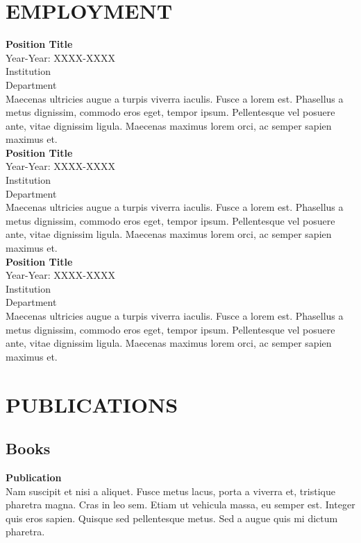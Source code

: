 \documentclass[a4paper,9pt]{extarticle}
\begin{document}
\section*{EMPLOYMENT}
\noindent
\newline
\textbf{Position Title} \\
Year-Year: XXXX-XXXX \\
Institution \\ 
Department \\
Maecenas ultricies augue a turpis viverra iaculis. Fusce a lorem est. Phasellus a metus dignissim, commodo eros eget, tempor ipsum. Pellentesque vel posuere ante, vitae dignissim ligula. Maecenas maximus lorem orci, ac semper sapien maximus et. \\ 

\noindent
\textbf{Position Title} \\
Year-Year: XXXX-XXXX \\
Institution \\ 
Department \\
Maecenas ultricies augue a turpis viverra iaculis. Fusce a lorem est. Phasellus a metus dignissim, commodo eros eget, tempor ipsum. Pellentesque vel posuere ante, vitae dignissim ligula. Maecenas maximus lorem orci, ac semper sapien maximus et. \\

\noindent
\textbf{Position Title} \\
Year-Year: XXXX-XXXX \\
Institution \\ 
Department \\
Maecenas ultricies augue a turpis viverra iaculis. Fusce a lorem est. Phasellus a metus dignissim, commodo eros eget, tempor ipsum. Pellentesque vel posuere ante, vitae dignissim ligula. Maecenas maximus lorem orci, ac semper sapien maximus et. 


\section*{PUBLICATIONS}
 
\subsection*{Books}
\textbf{Publication} \\ 
Nam suscipit et nisi a aliquet. Fusce metus lacus, porta a viverra et, tristique pharetra magna. Cras in leo sem. Etiam ut vehicula massa, eu semper est. Integer quis eros sapien. Quisque sed pellentesque metus. Sed a augue quis mi dictum pharetra. 
\end{document}
